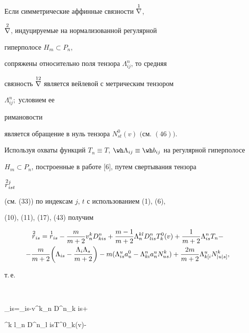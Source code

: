 \begin{thm} Если симметрические аффинные связности $\overset{1}{\nabla}{}$, 


$\overset{2}{\nabla}{}$, индуцируемые на нормализованной регулярной 


гиперполосе $H_m\subset P_n$, 


сопряжены относительно поля тензора $\Lambda^n_{ij}$, то средняя 


связность $\overset{12}{\nabla}{}$ является вейлевой с метрическим тензором 


$\Lambda^n_{ij};$ условием ее 


римановости 


является обращение в нуль тензора $N^0_{s t}(v)$ $($см. $(46))$. 


\end{thm} 


 


Используя охваты функций $T_n\equiv T$, $\wh\Lambda_{ij}\equiv\wh 


b_{ij}$ на регулярной гиперполосе 


$H_m\subset P_n$, построенные в работе [6], путем свертывания тензора 


$\overset{\,2}{r}{}^j_{is t}$ 


(см. (33)) по индексам $j$, $t$ с использованием (1), (6), 


(10), (11), (17), (43) получим 


\begin{multline*} 


\up{\,2}{r}_{is}=\up{\,1}{r}_{is}-\frac{m}{m+2} 


v^k_n D^n_{k is}+\frac{m-1}{m+2}\Lambda^{k l}_n 


D^n_{l is}T^0_k(v)+\frac{1}{m+2}\Lambda^n_{is}T_n- \\


%


-\frac{m}{m+2}\bigg(\Lambda_{is}-\frac{\Lambda_i\Lambda_s}{m+2} 


\bigg)-m(\Lambda^u_{is}a^0_u-\Lambda^n_{k i}a^u_n N^k_{us})+ 


\frac{2m}{m+2}\Lambda^u_{k[i}N^k_{|u|s]}, 


\end{multline*}  


т.\,е. 


$$ 


_{is}=_{is}-v^k_n D^n_{k is}+ 


\Lambda^{k l}_n D^n_{l is}T^0_k(v)- 



